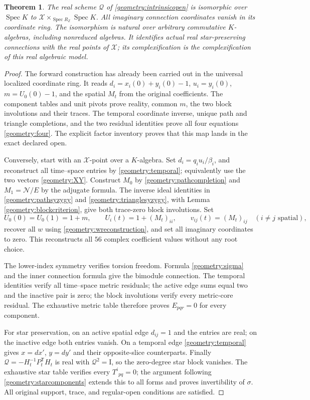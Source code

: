 \documentclass[11pt,a4paper]{article}
\newtheorem{theorem}{Theorem}[section]
\theoremstyle{remark}\newtheorem{remark}[theorem]{Remark}
\newcommand{\Spec}{\operatorname{Spec}}\newcommand{\tr}{\operatorname{tr}}
\newcommand{\Id}{\mathrm I}\newcommand{\F}{\mathbb F}
\begin{document}
\begin{theorem}\label{geometry:bridge}
The real scheme \(\mathcal Q\) of
\eqref{geometry:intrinsicopen} is isomorphic over \(\Spec K\) to
\(\mathcal X\times_{\Spec R_{\mathbb Z}}\Spec K\).
All imaginary connection coordinates vanish in its coordinate ring.
The isomorphism is natural over arbitrary commutative \(K\)-algebras,
including nonreduced algebras. It identifies actual real star-preserving
connections with the real points of \(\mathcal X\); its complexification
is the complexification of this real algebraic model.
\end{theorem}
\begin{proof}
The forward construction has already been carried out in the universal
localized coordinate ring. It reads
\(d_i=x_i(0)+y_i(0)-1\), \(u_i=y_i(0)\), \(m=U_0(0)-1\), and
the spatial \(M_t\) from the original coefficients. The component tables
and unit pivots prove reality, common \(m\), the two block involutions
and their traces. The temporal coordinate inverse, unique path and triangle
completions, and the two residual identities prove all four equations
\eqref{geometry:four}. The explicit factor inventory proves that this
map lands in the exact declared open.

Conversely, start with an \(\mathcal X\)-point over a \(K\)-algebra.
Set \(d_i=q_iu_i/\beta_i\), and reconstruct all time--space entries
by \eqref{geometry:temporal}; equivalently use the two vectors
\eqref{geometry:XY}. Construct \(M_0\) by
\eqref{geometry:pathcompletion} and \(M_1=\mathcal N/E\) by the
adjugate formula. The inverse ideal identities in
\eqref{geometry:pathsyzygy} and \eqref{geometry:trianglesyzygy}, with
Lemma \ref{geometry:blockcriterion}, give both trace-zero block
involutions. Set
\[
 U_0(0)=U_0(1)=1+m,\qquad
 U_i(t)=1+(M_t)_{ii},\qquad v_{ij}(t)=(M_t)_{ij}
       \quad(i\ne j\text{ spatial}),
\]
recover all \(w\) using \eqref{geometry:wreconstruction}, and set all
imaginary coordinates to zero. This reconstructs all \(56\) complex
coefficient values without any root choice.

The lower-index symmetry verifies torsion freedom. Formula
\eqref{geometry:sigma} and the inner connection formula give the
bimodule connection. The temporal identities verify all time--space metric
residuals; the active edge sums equal two and the inactive pair is zero;
the block involutions verify every metric-core residual. The exhaustive
metric table therefore proves \(E_{pqr}=0\) for every component.

For star preservation, on an active spatial edge \(d_{ij}=1\) and the
entries are real; on the inactive edge both entries vanish. On a temporal
edge \eqref{geometry:temporal} gives \(x=dx'\), \(y=dy'\) and their
opposite-slice counterparts. Finally
\(\mathscr Q=-H_t^{-1}P_t^{\mathsf T}H_t\) is real with
\(\mathscr Q^2=\Id\), so the zero-degree star block vanishes.
The exhaustive star table verifies every \(T^i{}_{pq}=0\); the argument
following \eqref{geometry:starcomponents} extends this to all forms and
proves invertibility of \(\sigma\). All original support, trace, and
regular-open conditions are satisfied.


\end{proof}
\end{document}
